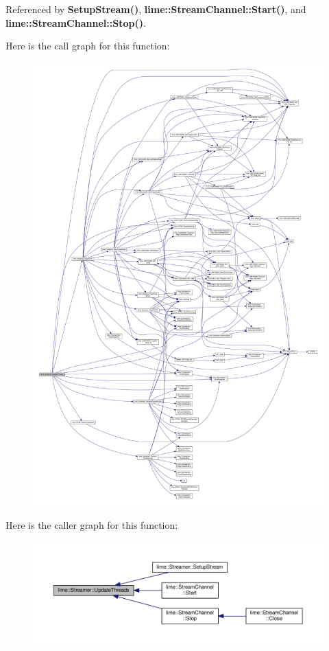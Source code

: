 Referenced by {\bf Setup\+Stream()}, {\bf lime\+::\+Stream\+Channel\+::\+Start()}, and {\bf lime\+::\+Stream\+Channel\+::\+Stop()}.



Here is the call graph for this function\+:
\nopagebreak
\begin{figure}[H]
\begin{center}
\leavevmode
\includegraphics[width=350pt]{d9/d5d/classlime_1_1Streamer_a33a233f1c863b9710f3b685d5fb494f6_cgraph}
\end{center}
\end{figure}




Here is the caller graph for this function\+:
\nopagebreak
\begin{figure}[H]
\begin{center}
\leavevmode
\includegraphics[width=350pt]{d9/d5d/classlime_1_1Streamer_a33a233f1c863b9710f3b685d5fb494f6_icgraph}
\end{center}
\end{figure}




